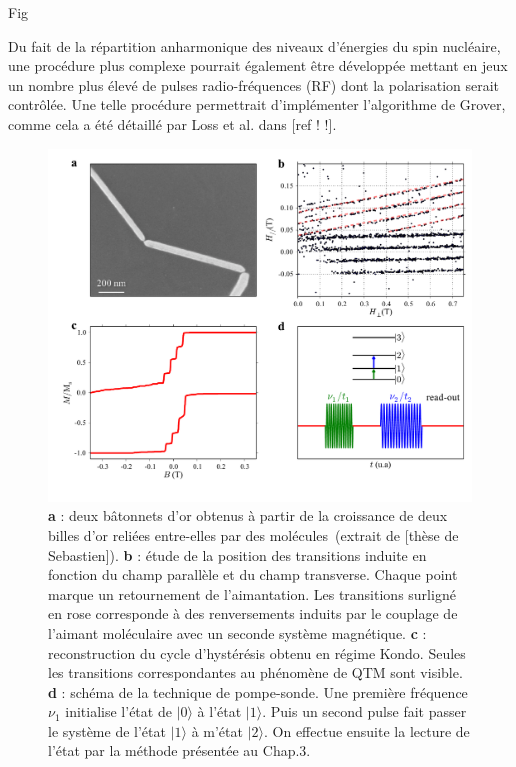Fig

Du fait de la répartition anharmonique des niveaux d’énergies du spin nucléaire, une procédure plus complexe pourrait également être développée mettant en jeux un nombre plus élevé de pulses radio-fréquences (RF) dont la polarisation serait contrôlée. Une telle procédure permettrait d’implémenter l'algorithme de Grover, comme cela a été détaillé par Loss et al. dans [ref ! !].

\begin{figure}
\centering \includegraphics[scale=0.45]{Conclusion/Perspectives/Perspectives.pdf} 
\caption{\textbf{a} : deux bâtonnets d'or obtenus à partir de la croissance de deux billes d'or reliées entre-elles par des molécules~(extrait de [thèse de Sebastien]). \textbf{b} : étude de la position des transitions induite en fonction du champ parallèle et du champ transverse. Chaque point marque un retournement de l'aimantation. Les transitions surligné en rose corresponde à des renversements induits par le couplage de l'aimant moléculaire avec un seconde système magnétique. \textbf{c} : reconstruction du cycle d'hystérésis obtenu en régime Kondo. Seules les transitions correspondantes au phénomène de QTM sont visible. \textbf{d} : schéma de la technique de pompe-sonde. Une première fréquence $\nu_1$ initialise l'état de $|0\rangle$ à l'état $|1\rangle$. Puis un second pulse fait passer le système de l'état $|1\rangle$ à m'état $|2\rangle$. On effectue ensuite la lecture de l'état par la méthode présentée au Chap.3.}
\label{Perspectives}
\end{figure}

